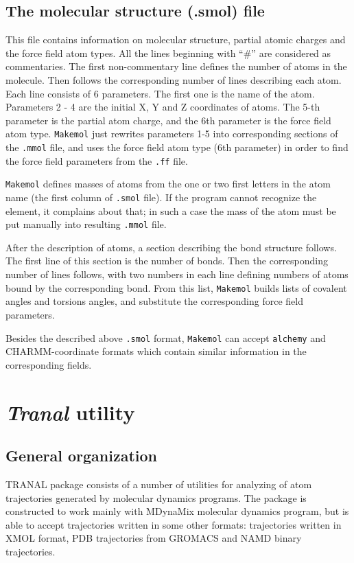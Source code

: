 \documentclass{article}
\begin{document}
\subsection{The molecular structure (.smol) file}

This file contains information on molecular structure, partial atomic 
charges and the force field atom types. All the lines beginning with 
``\#'' are considered as commentaries. The first non-commentary line
defines the number of atoms in the molecule. Then follows the corresponding
number of lines describing each atom. Each line consists of 6 parameters.
The first one is the name of the atom. Parameters 2 - 4 are the initial 
X, Y and Z coordinates of atoms. The 5-th parameter is the partial atom
charge, and the 6th parameter is the force field atom type. \verb|Makemol| 
just rewrites parameters 1-5 into corresponding sections of the \verb|.mmol| 
file, and uses the force field atom type (6th parameter) in order to
find the force field parameters from the \verb|.ff| file.

\verb|Makemol| defines masses of atoms from the one or two first letters in 
the atom name (the first column of \verb|.smol| file). If the program cannot 
recognize the element, it complains about that; in such a case the mass of 
the atom must be put manually into resulting \verb|.mmol| file.

After the description of atoms, a section describing the bond structure 
follows. The first line of this section is the number of bonds. Then
the corresponding number of lines follows, with two numbers in each line 
defining numbers of atoms bound by the corresponding bond. From this list, 
\verb|Makemol| builds lists of covalent angles and torsions angles, and
substitute the corresponding force field parameters.

Besides the described above \verb|.smol| format, \verb|Makemol| can accept
\verb|alchemy| and CHARMM-coordinate formats which contain similar
information in the corresponding fields.

\section{{\em Tranal} utility}

\subsection{General organization}

TRANAL package consists of a number of utilities for analyzing of atom 
trajectories generated by molecular dynamics programs. The package
is constructed to work mainly with MDynaMix molecular dynamics program,
but is able to accept trajectories written in some other formats: 
trajectories written in XMOL format, PDB trajectories from GROMACS and 
NAMD binary trajectories.
\end{document}
